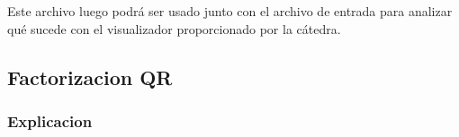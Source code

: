 Este archivo luego podrá ser usado junto con el archivo de entrada para analizar qué sucede con el visualizador proporcionado por la cátedra.


\subsection{Factorizacion QR}
\subsubsection{Explicacion}







